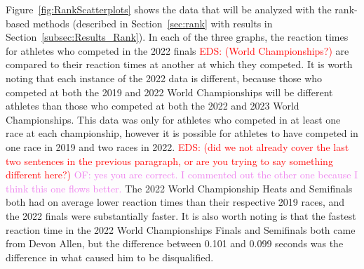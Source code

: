 \documentclass[12pt, letterpaper, titlepage]{article}
\newcommand{\eds}[1]{\textcolor{red}{EDS: (#1)}}
\newcommand{\of}[1]{\textcolor{violet}{OF: #1}}
\begin{document}
Figure~\ref{fig:RankScatterplots} shows the data that will be analyzed
with the rank-based methods (described in Section~\ref{sec:rank} with results in 
Section~\ref{subsec:Results_Rank}). In each of the three graphs, the reaction 
times for athletes who competed
in the 2022 finals \eds{World Championships?} are compared to their reaction
times at another at which they competed.  
It is worth noting that each instance of the 2022 data is different, because
those who competed at both the 2019 and 2022 World Championships will be
different athletes than those who competed at both the 2022 and 2023 World
Championships. This data was only for athletes who competed
in at least one race at each championship, however it is possible for athletes
to have competed in one race in 2019 and two races in 2022. 
\eds{did we not already cover the last two sentences in the previous paragraph, 
or are you trying to say something different here?} \of{yes you are correct. I
commented out the other one because I think this one flows better.}  The 2022 World
Championship Heats and Semifinals both had on average lower reaction times than
their respective 2019 races, and the 2022 finals were substantially faster. It
is also worth noting is that the fastest reaction time in the 2022 World
Championships Finals and Semifinals both came from Devon Allen, but the 
difference between 0.101 and 0.099
seconds was the difference in what caused him to be disqualified. 
\end{document}
